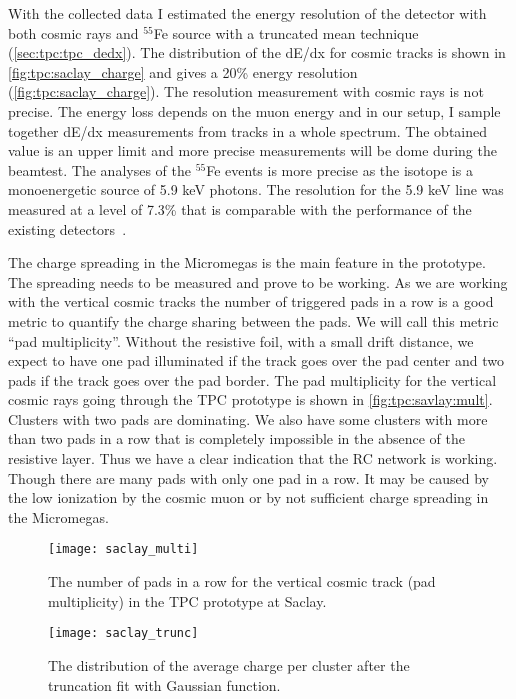 \documentclass[../main.tex]{subfiles}
\begin{document}
With the collected data I estimated the energy resolution of the detector with both cosmic rays and ${}^{55}$Fe source with a truncated mean technique (\autoref{sec:tpc:tpc_dedx}). The distribution of the dE/dx for cosmic tracks is shown in \autoref{fig:tpc:saclay_charge} and gives a 20\% energy resolution (\autoref{fig:tpc:saclay_charge}). The resolution measurement with cosmic rays is not precise. The energy loss depends on the muon energy and in our setup, I sample together dE/dx measurements from tracks in a whole spectrum. The obtained value is an upper limit and more precise measurements will be dome during the beamtest. The analyses of the ${}^{55}$Fe events is more precise as the isotope is a monoenergetic source of 5.9 keV photons. The resolution for the 5.9 keV line was measured at a level of 7.3\% that is comparable with the performance of the existing detectors~\cite{Abgrall2011}.

The charge spreading in the Micromegas is the main feature in the prototype. The spreading needs to be measured and prove to be working. As we are working with the vertical cosmic tracks the number of triggered pads in a row is a good metric to quantify the charge sharing between the pads. We will call this metric ``pad multiplicity''. Without the resistive foil, with a small drift distance, we expect to have one pad illuminated if the track goes over the pad center and two pads if the track goes over the pad border. The pad multiplicity for the vertical cosmic rays going through the TPC prototype is shown in \autoref{fig:tpc:savlay:mult}. Clusters with two pads are dominating. We also have some clusters with more than two pads in a row that is completely impossible in the absence of the resistive layer. Thus we have a clear indication that the RC network is working. Though there are many pads with only one pad in a row. It may be caused by the low ionization by the cosmic muon or by not sufficient charge spreading in the Micromegas.

\begin{figure}[!ht]
  \centering
  \begin{minipage}{0.45\linewidth}
    \centering
    \texttt{[image: saclay\_multi]}
    \caption{The number of pads in a row for the vertical cosmic track (pad multiplicity) in the TPC prototype at Saclay.}
    \label{fig:tpc:savlay:mult}
  \end{minipage}
  \begin{minipage}{0.09\linewidth}
    \hspace{\linewidth}
  \end{minipage}
  \begin{minipage}{0.45\linewidth}
    \centering
    \texttt{[image: saclay\_trunc]}
    \caption{The distribution of the average charge per cluster after the truncation fit with Gaussian function.}
    \label{fig:tpc:saclay_charge}
  \end{minipage}
\end{figure}
\end{document}
